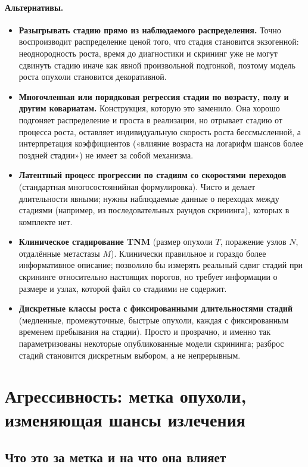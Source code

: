 \documentclass[12pt,a4paper]{article}
\newcommand{\alt}[1]{\paragraph{Альтернативы.} #1}
\begin{document}
\alt{\begin{itemize}[nosep]
  \item \textbf{Разыгрывать стадию прямо из наблюдаемого распределения.} Точно воспроизводит распределение
        ценой того, что стадия становится экзогенной: неоднородность роста, время до диагностики и скрининг
        уже не могут сдвинуть стадию иначе как явной произвольной подгонкой, поэтому модель роста опухоли
        становится декоративной.
  \item \textbf{Многочленная или порядковая регрессия стадии по возрасту, полу и другим ковариатам.}
        Конструкция, которую это заменило. Она хорошо подгоняет распределение и проста в реализации, но
        отрывает стадию от процесса роста, оставляет индивидуальную скорость роста бессмысленной, а
        интерпретация коэффициентов («влияние возраста на логарифм шансов более поздней стадии») не имеет за
        собой механизма.
  \item \textbf{Латентный процесс прогрессии по стадиям со скоростями переходов} (стандартная
        многосостоянийная формулировка). Чисто и делает длительности явными; нужны наблюдаемые данные о
        переходах между стадиями (например, из последовательных раундов скрининга), которых в комплекте нет.
  \item \textbf{Клиническое стадирование TNM} (размер опухоли $T$, поражение узлов $N$, отдалённые
        метастазы $M$). Клинически правильное и гораздо более информативное описание; позволило бы измерять
        реальный сдвиг стадий при скрининге относительно настоящих порогов, но требует информации о размере
        и узлах, которой файл со стадиями не содержит.
  \item \textbf{Дискретные классы роста с фиксированными длительностями стадий} (медленные, промежуточные,
        быстрые опухоли, каждая с фиксированным временем пребывания на стадии). Просто и прозрачно, и именно
        так параметризованы некоторые опубликованные модели скрининга; разброс стадий становится дискретным
        выбором, а не непрерывным.
\end{itemize}}

\section{Агрессивность: метка опухоли, изменяющая шансы излечения}
\label{sec:agg}

\subsection{Что это за метка и на что она влияет}
\end{document}
